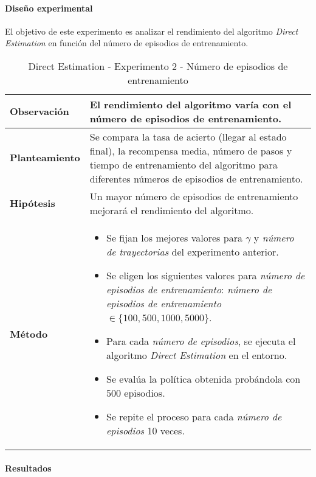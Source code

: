 \paragraph{Diseño experimental}

El objetivo de este experimento es analizar el rendimiento del algoritmo \textit{Direct Estimation} en función del número de episodios de entrenamiento.

\begin{table}[H]
    \centering
    \begin{tabularx}{\textwidth}{|p{4cm}|X|} %
        \hline %
        \textbf{Observación} & El rendimiento del algoritmo varía con el número de episodios de entrenamiento.
        \\ \hline
        \textbf{Planteamiento} & Se compara la tasa de acierto (llegar al estado final), la recompensa media, número de pasos y tiempo de entrenamiento del algoritmo para diferentes números de episodios de entrenamiento.
        \\ \hline
        \textbf{Hipótesis} & Un mayor número de episodios de entrenamiento mejorará el rendimiento del algoritmo.
        \\ \hline
        \textbf{Método} & 
        \begin{itemize}
            \item Se fijan los mejores valores para \(\gamma\) y \textit{número de trayectorias} del experimento anterior.
            \item Se eligen los siguientes valores para \textit{número de episodios de entrenamiento}: \textit{número de episodios de entrenamiento} \(\in \{100, 500, 1000, 5000\}\).
            \item Para cada \textit{número de episodios}, se ejecuta el algoritmo \textit{Direct Estimation} en el entorno.
            \item Se evalúa la política obtenida probándola con 500 episodios.
            \item Se repite el proceso para cada \textit{número de episodios} 10 veces.
        \end{itemize}
        \\ \hline
    \end{tabularx}
    \caption{Direct Estimation - Experimento 2 - Número de episodios de entrenamiento}
    \label{tab:diseñoDirectEstimationExp2}
\end{table}

\paragraph{Resultados}

